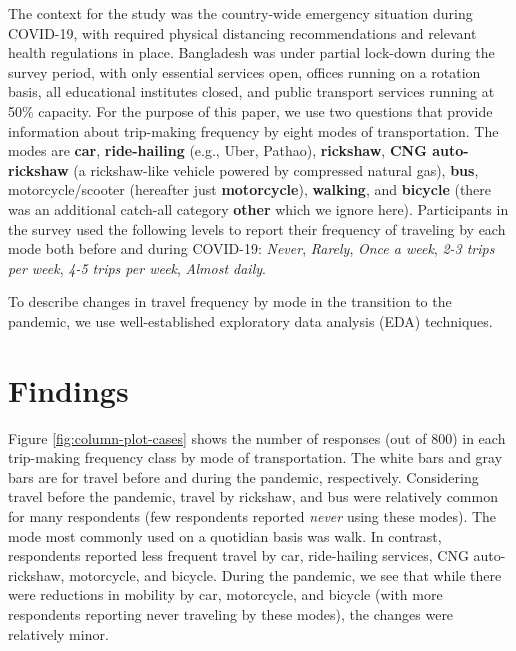 \documentclass[]{elsarticle} %
\begin{document}
The context for the study was the country-wide emergency situation
during COVID-19, with required physical distancing recommendations and
relevant health regulations in place. Bangladesh was under partial
lock-down during the survey period, with only essential services open,
offices running on a rotation basis, all educational institutes closed,
and public transport services running at 50\% capacity. For the purpose
of this paper, we use two questions that provide information about
trip-making frequency by eight modes of transportation. The modes are
\textbf{car}, \textbf{ride-hailing} (e.g., Uber, Pathao),
\textbf{rickshaw}, \textbf{CNG auto-rickshaw} (a rickshaw-like vehicle
powered by compressed natural gas), \textbf{bus}, motorcycle/scooter
(hereafter just \textbf{motorcycle}), \textbf{walking}, and
\textbf{bicycle} (there was an additional catch-all category
\textbf{other} which we ignore here). Participants in the survey used
the following levels to report their frequency of traveling by each mode
both before and during COVID-19: \emph{Never}, \emph{Rarely}, \emph{Once
a week}, \emph{2-3 trips per week}, \emph{4-5 trips per week},
\emph{Almost daily}.

To describe changes in travel frequency by mode in the transition to the
pandemic, we use well-established exploratory data analysis (EDA)
techniques.

\hypertarget{findings}{%
\section{Findings}\label{findings}}

Figure \ref{fig:column-plot-cases} shows the number of responses (out of
800) in each trip-making frequency class by mode of transportation. The
white bars and gray bars are for travel before and during the pandemic,
respectively. Considering travel before the pandemic, travel by
rickshaw, and bus were relatively common for many respondents (few
respondents reported \emph{never} using these modes). The mode most
commonly used on a quotidian basis was walk. In contrast, respondents
reported less frequent travel by car, ride-hailing services, CNG
auto-rickshaw, motorcycle, and bicycle. During the pandemic, we see that
while there were reductions in mobility by car, motorcycle, and bicycle
(with more respondents reporting never traveling by these modes), the
changes were relatively minor.
\end{document}
